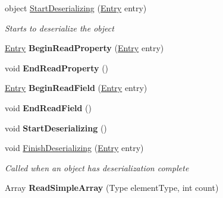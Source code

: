 \begin{DoxyCompactItemize}
object \hyperlink{class_serialization_1_1_binary_serializer_a9b376977bd19d9bfef1fce28e110220a}{Start\+Deserializing} (\hyperlink{class_serialization_1_1_entry}{Entry} entry)
\begin{DoxyCompactList}\small\item\em Starts to deserialize the object \end{DoxyCompactList}\item 
\mbox{\label{class_serialization_1_1_binary_serializer_a0c77f70b9259bc13d96eafe34b092f3b}} 
\hyperlink{class_serialization_1_1_entry}{Entry} {\bfseries Begin\+Read\+Property} (\hyperlink{class_serialization_1_1_entry}{Entry} entry)
\item 
\mbox{\label{class_serialization_1_1_binary_serializer_a0b50b703f7b33e2b60421611a3757716}} 
void {\bfseries End\+Read\+Property} ()
\item 
\mbox{\label{class_serialization_1_1_binary_serializer_ab6dd090acf50ee9f39d461fa7e7c61d6}} 
\hyperlink{class_serialization_1_1_entry}{Entry} {\bfseries Begin\+Read\+Field} (\hyperlink{class_serialization_1_1_entry}{Entry} entry)
\item 
\mbox{\label{class_serialization_1_1_binary_serializer_a0c52bbac20e29e59f6c48868d4729928}} 
void {\bfseries End\+Read\+Field} ()
\item 
\mbox{\label{class_serialization_1_1_binary_serializer_a379a76963492f1fb3a8168e794148683}} 
void {\bfseries Start\+Deserializing} ()
\item 
void \hyperlink{class_serialization_1_1_binary_serializer_ad89d25a0b56c1b568f6696ab8d04d10b}{Finish\+Deserializing} (\hyperlink{class_serialization_1_1_entry}{Entry} entry)
\begin{DoxyCompactList}\small\item\em Called when an object has deserialization complete \end{DoxyCompactList}\item 
\mbox{\label{class_serialization_1_1_binary_serializer_a611b0f83ba611a0ecf394a9920dbab1b}} 
Array {\bfseries Read\+Simple\+Array} (Type element\+Type, int count)

\end{DoxyCompactItemize}
